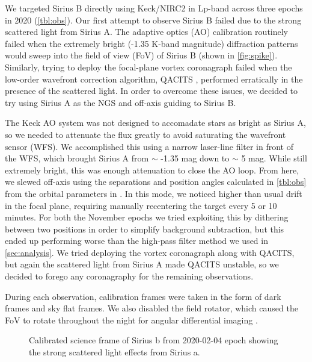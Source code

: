 \documentclass[twocolumn]{aastex631}
\begin{document}
We targeted Sirius B directly using Keck/NIRC2 in Lp-band across three epochs in 2020 (\autoref{tbl:obs}). Our first attempt to observe Sirius B failed due to the strong scattered light from Sirius A. The adaptive optics (AO) calibration routinely failed when the extremely bright (-1.35 K-band magnitude) diffraction patterns would sweep into the field of view (FoV) of Sirius B (shown in \autoref{fig:spike}). Similarly, trying to deploy the focal-plane vortex coronagraph \citep{serabyn_w_2017} failed when the low-order wavefront correction algorithm, QACITS \citep{huby_w_2017}, performed erratically in the presence of the scattered light. In order to overcome these issues, we decided to try using Sirius A as the NGS and off-axis guiding to Sirius B.

The Keck AO system \citep{wizinowich_performance_2000} was not designed to accomadate stars as bright as Sirius A, so we needed to attenuate the flux greatly to avoid saturating the wavefront sensor (WFS). We accomplished this using a narrow laser-line filter in front of the WFS, which brought Sirius A from $\sim$ -1.35 mag down to $\sim$ 5 mag. While still extremely bright, this was enough attenuation to close the AO loop. From here, we slewed off-axis using the separations and position angles calculated in \autoref{tbl:obs} from the orbital parameters in \cite{bond_sirius_2017}. In this mode, we noticed higher than usual drift in the focal plane, requiring manually recentering the target every 5 or 10 minutes. For both the November epochs we tried exploiting this by dithering between two positions in order to simplify background subtraction, but this ended up performing worse than the high-pass filter method we used in \autoref{sec:analysis}. We tried deploying the vortex coronagraph along with QACITS, but again the scattered light from Sirius A made QACITS unstable, so we decided to forego any coronagraphy for the remaining observations.

During each observation, calibration frames were taken in the form of dark frames and sky flat frames. We also disabled the field rotator, which caused the FoV to rotate throughout the night for angular differential imaging \citep[ADI;][]{marois_angular_2006}.

\begin{figure}
    \centering
    \caption{Calibrated science frame of Sirius b from 2020-02-04 epoch showing the strong scattered light effects from Sirius a.}
    \label{fig:spike}
\end{figure}
\end{document}

